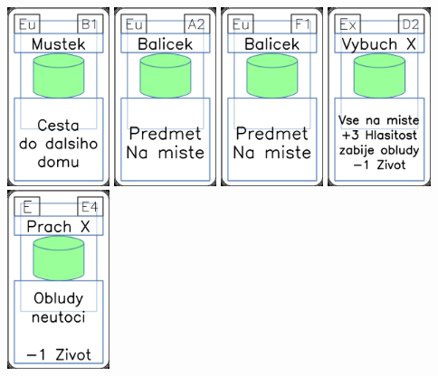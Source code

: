 \documentclass[a4paper]{article}
\begin{document}
	\includegraphics[width=3.0cm]{img-4_35}
	\includegraphics[width=3.0cm]{img-4_31}
	\includegraphics[width=3.0cm]{img-4_25}
	\includegraphics[width=3.0cm]{img-4_16}
	\includegraphics[width=3.0cm]{img-4_53}
\end{document}
